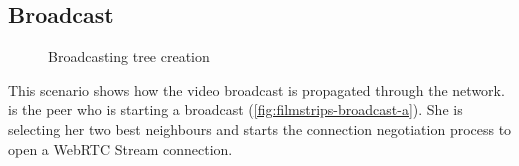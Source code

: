 \subsection{Broadcast}

\begin{figure}[htb!]
  \centering
	\caption{Broadcasting tree creation}
\label{fig:filmstrips-broadcast}
\end{figure}

This scenario shows how the video broadcast is propagated through the network. \claire is the peer who is starting a broadcast (\vref{fig:filmstrips-broadcast-a}). 
She is selecting her two best neighbours and starts the connection negotiation process to open a WebRTC Stream connection. 

